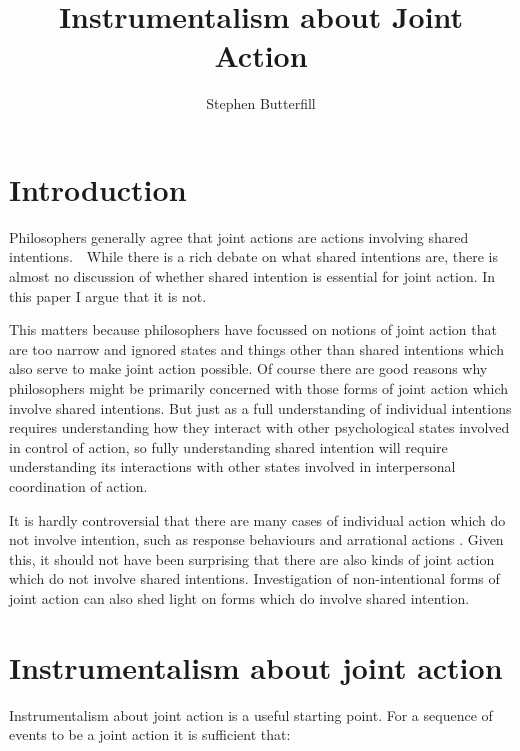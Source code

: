 \documentclass[12pt]{amsart}
\title{Instrumentalism about Joint Action}
\author{Stephen Butterfill}
\begin{document}


\maketitle

\section{Introduction}
Philosophers generally agree that joint actions are actions involving shared intentions.\footnotemark \ \   While there is a rich debate on what shared intentions are, there is almost no discussion of whether shared intention is essential for joint action.  In this paper I argue that it is not.


This matters  because philosophers have focussed on notions of joint action that are too narrow and ignored states and things other than shared intentions which also serve to make joint action possible.  Of course there are good reasons why philosophers might be primarily concerned with those forms of joint action which involve shared intentions.  But just as a full understanding of individual intentions requires understanding how they interact with other psychological states involved in control of action, so fully understanding shared intention will require understanding its interactions with other states involved in interpersonal coordination of action.

It is hardly controversial that there are many cases of individual action which do not involve intention, such as response behaviours \citep{Dickinson:1993oy} and arrational actions \citep{Hursthouse:1991rd}.  Given this, it should not have been surprising that there are also kinds of joint action which do not involve shared intentions.  Investigation of non-intentional forms of joint action can also shed light on forms which do involve shared intention.  



\section{Instrumentalism about joint action}
Instrumentalism about joint action is a useful starting point.  For a sequence of events to be a joint action it is sufficient that:
\end{document}
